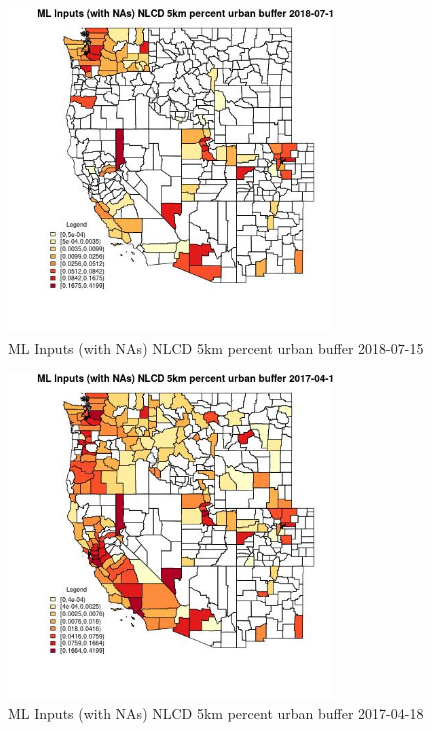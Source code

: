 \begin{figure} 
\centering  
\includegraphics[width=0.77\textwidth]{Code_Outputs/Report_ML_input_PM25_Step4_part_e_de_duplicated_aves_compiled_2019-05-21wNAs_CountyNLCD_5km_percent_urban_bufferMean2018-07-15.jpg} 
\caption{\label{fig:Report_ML_input_PM25_Step4_part_e_de_duplicated_aves_compiled_2019-05-21wNAsCountyNLCD_5km_percent_urban_bufferMean2018-07-15}ML Inputs (with NAs) NLCD 5km percent urban buffer 2018-07-15} 
\end{figure} 
 

\begin{figure} 
\centering  
\includegraphics[width=0.77\textwidth]{Code_Outputs/Report_ML_input_PM25_Step4_part_e_de_duplicated_aves_compiled_2019-05-21wNAs_CountyNLCD_5km_percent_urban_bufferMean2017-04-18.jpg} 
\caption{\label{fig:Report_ML_input_PM25_Step4_part_e_de_duplicated_aves_compiled_2019-05-21wNAsCountyNLCD_5km_percent_urban_bufferMean2017-04-18}ML Inputs (with NAs) NLCD 5km percent urban buffer 2017-04-18} 
\end{figure} 
 

